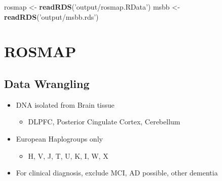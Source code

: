 \documentclass[]{book}
\newenvironment{Shaded}{\begin{snugshade}}{\end{snugshade}}
\newcommand{\KeywordTok}[1]{\textcolor[rgb]{0.13,0.29,0.53}{\textbf{#1}}}
\newcommand{\NormalTok}[1]{#1}
\newcommand{\StringTok}[1]{\textcolor[rgb]{0.31,0.60,0.02}{#1}}
\providecommand{\tightlist}{%
  \setlength{\itemsep}{0pt}\setlength{\parskip}{0pt}}
\begin{document}
\begin{Shaded}
\begin{Highlighting}[]
\NormalTok{rosmap <-}\StringTok{ }\KeywordTok{readRDS}\NormalTok{(}\StringTok{'output/rosmap.RData'}\NormalTok{)}
\NormalTok{msbb <-}\StringTok{ }\KeywordTok{readRDS}\NormalTok{(}\StringTok{'output/msbb.rds'}\NormalTok{)}
\end{Highlighting}
\end{Shaded}

\hypertarget{rosmap-1}{%
\section{ROSMAP}\label{rosmap-1}}

\hypertarget{data-wrangling}{%
\subsection{Data Wrangling}\label{data-wrangling}}

\begin{itemize}
\tightlist
\item
  DNA isolated from Brain tissue

  \begin{itemize}
  \tightlist
  \item
    DLPFC, Posterior Cingulate Cortex, Cerebellum
  \end{itemize}
\item
  European Haplogroups only

  \begin{itemize}
  \tightlist
  \item
    H, V, J, T, U, K, I, W, X
  \end{itemize}
\item
  For clinical diagnosis, exclude MCI, AD possible, other dementia
\end{itemize}
\end{document}
